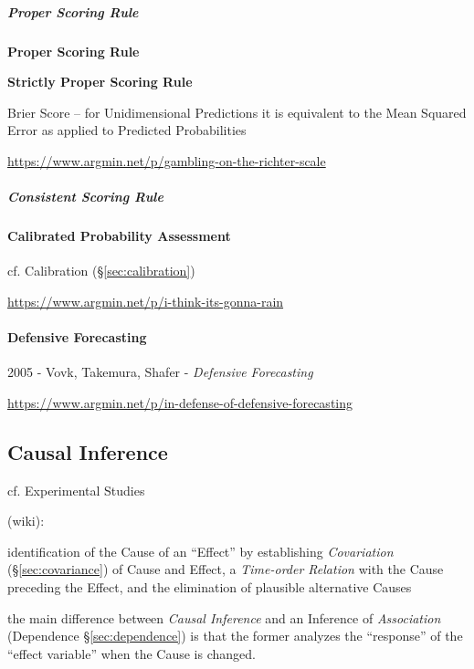 \subparagraph{Proper Scoring Rule}\label{sec:proper_scoring}\hfill

\textbf{Proper Scoring Rule}

\textbf{Strictly Proper Scoring Rule}

Brier Score -- for Unidimensional Predictions it is equivalent to the Mean
Squared Error as applied to Predicted Probabilities

\url{https://www.argmin.net/p/gambling-on-the-richter-scale}



\subparagraph{Consistent Scoring Rule}\label{sec:consistent_scoring}\hfill



\paragraph{Calibrated Probability Assessment}\label{sec:calibrated_probability}
\hfill

\fist cf. Calibration (\S\ref{sec:calibration})

\url{https://www.argmin.net/p/i-think-its-gonna-rain}



\paragraph{Defensive Forecasting}\label{sec:defensive_forecasting}\hfill

2005 - Vovk, Takemura, Shafer - \emph{Defensive Forecasting}

\url{https://www.argmin.net/p/in-defense-of-defensive-forecasting}



\subsection{Causal Inference}\label{sec:causal_inference}

cf. Experimental Studies

(wiki):

identification of the Cause of an ``Effect'' by establishing \emph{Covariation}
(\S\ref{sec:covariance}) of Cause and Effect, a \emph{Time-order Relation} with
the Cause preceding the Effect, and the elimination of plausible alternative
Causes

the main difference between \emph{Causal Inference} and an Inference of
\emph{Association} (Dependence \S\ref{sec:dependence}) is that the former
analyzes the ``response'' of the ``effect variable'' when the Cause is changed.


